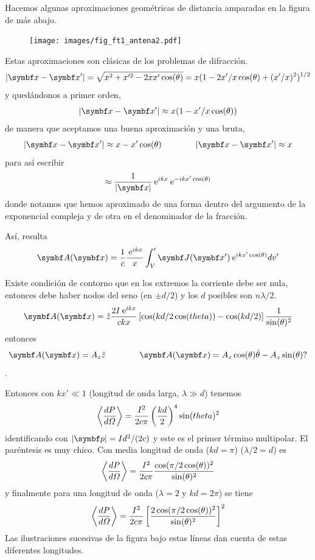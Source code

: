 \documentclass[10pt,oneside]{CBFT_book}
\begin{document}
Hacemos algunas aproximaciones geométricas de distancia amparadas en la figura de más abajo.
	\begin{figure}[htb]
		\begin{center}
		\texttt{[image: images/fig\_ft1\_antena2.pdf]}	 
		\end{center}
		\caption{}
	\end{figure} 

Estas aproximaciones son clásicas de los problemas de difracción.
\[
	|\vb{x}-\vb{x}'| = \sqrt{ x^2 + x'^2 - 2xx'\cos(\theta)} =  
	x( 1 - 2x'/x \cos(\theta) + (x'/x)^2)^{1/2} 
\]
y quedándonos a primer orden,
\[
	|\vb{x}-\vb{x}'|\approx x (1 - x'/x \cos(\theta))
\]
de manera que aceptamos una buena aproximación y una bruta,
\[
	|\vb{x}-\vb{x}'| \approx x - x' \cos( \theta ) \qquad \qquad |\vb{x}-\vb{x}'| \approx x
\]
para así escribir
\[
	\approx \frac{1}{|\vb{x}|} \euler^{ikx} \euler^{-ikx'\cos(\theta)}
\]
donde notamos que hemos aproximado de una forma dentro del argumento de la exponencial compleja
y de otra en el denominador de la fracción.

Así, resulta
\[
	\vb{A}(\vb{x}) = \frac{1}{c} \frac{\euler^{ i k x} }{x} \int_V' \vb{J}(\vb{x}') 
		\euler^{ i k x' \cos(\theta) } dv'
\]

Existe condición de contorno que en los extremos la corriente debe ser nula, entonces debe haber nodos
del seno (en $\pm d/2$) y los $d$ posibles son $ n\lambda/2$.
\[
	\vb{A}(\vb{x}) = \hat{z} \frac{2I\euler^{ikx}}{ckx}\left[ \cos( kd/2 \cos(theta) )- 
		\cos( kd/2 ) \right]\frac{1}{\sin(\theta)^2}
\]
entonces 
\[
	\vb{A}(\vb{x}) = A_z \hat{z} \qquad \qquad \vb{A}(\vb{x}) =  A_z\cos(\theta)\hat{\theta} - 
		A_z\sin(\theta) ?
\]
.

Entonces con $ kx' \ll 1$ (longitud de onda larga, $\lambda \gg d $) tenemos
\[
	\left\langle\frac{d^{\hspace{-0.05em}} {P}}{d {\Omega}^{\hspace{-0.05em}}}\right\rangle = \frac{I^2}{2c\pi}\left( \frac{kd}{2} \right)^4 
		\sin(theta)^2
\]
identificando con $|\vb{p}| = Id^2/(2c)$ y este es el primer término multipolar. El paréntesis es muy
chico.
Con media longitud de onda ($kd=\pi$) ($\lambda/2=d$) es
\[
	\left\langle\frac{d^{\hspace{-0.05em}} {P}}{d {\Omega}^{\hspace{-0.05em}}}\right\rangle=\frac{I^2}{2c\pi}\frac{\cos(\pi/2 
	\cos(\theta))^2}{\sin(\theta)^2}
\]
y finalmente para una longitud de onda ($\lambda=2$ y $kd=2\pi$) se tiene 
\[
	\left\langle\frac{d^{\hspace{-0.05em}} {P}}{d {\Omega}^{\hspace{-0.05em}}}\right\rangle=\frac{I^2}{2c\pi} \left[ \frac{ 2\cos(\pi/2 
	\cos(\theta))^2}{\sin(\theta)^2} \right]^2
\]
Las ilustraciones sucesivas de la figura bajo estas líneas dan cuenta de estas diferentes longitudes.
\end{document}
